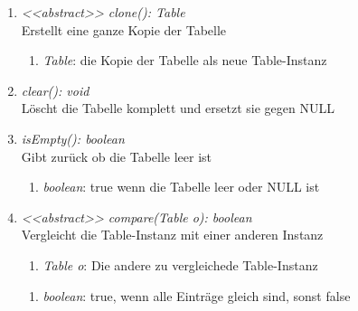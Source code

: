 \begin{enumerate}[+]
	\item \textit{<{<abstract>}> clone(): Table} \\
	Erstellt eine ganze Kopie der Tabelle
	\vspace{-0.2cm}
	\begin{enumerate}[$\circ$]
		\item \textit{Table}: die Kopie der Tabelle als neue Table-Instanz
	\end{enumerate}

	\item \textit{clear(): void} \\
	Löscht die Tabelle komplett und ersetzt sie gegen NULL

	\item \textit{isEmpty(): boolean} \\
	Gibt zurück ob die Tabelle leer ist
	\vspace{-0.2cm}
	\begin{enumerate}[$\circ$]
		\item \textit{boolean}: true wenn die Tabelle leer oder NULL ist
	\end{enumerate}

	\item \textit{<{<abstract>}> compare(Table o): boolean} \\
	Vergleicht die Table-Instanz mit einer anderen Instanz
	\begin{enumerate}[$\bullet$]
		\item \textit{Table o}: Die andere zu vergleichede Table-Instanz
	\end{enumerate}
	\vspace{-0.2cm}
	\begin{enumerate}[$\circ$]
		\item \textit{boolean}: true, wenn alle Einträge gleich sind, sonst false
	\end{enumerate}
\end{enumerate}